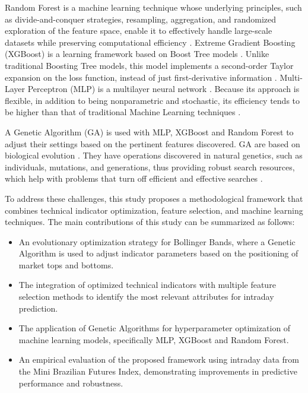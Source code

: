 \documentclass{ieeeaccess}
\begin{document}
Random Forest is a machine learning technique whose underlying principles, such as divide-and-conquer strategies, resampling, aggregation, and randomized exploration of the feature space, enable it to effectively handle large-scale datasets while preserving computational efficiency \cite{biau2016random}. Extreme Gradient Boosting (XGBoost) is a learning framework based on Boost Tree models \cite{chen2016xgboost}. Unlike traditional Boosting Tree models, this model implements a second-order Taylor expansion on the loss function, instead of just first-derivative information \cite{li2019gene}. Multi-Layer Perceptron (MLP) is a multilayer neural network \cite{taud2017multilayer}. Because its approach is flexible, in addition to being nonparametric and stochastic, its efficiency tends to be higher than that of traditional Machine Learning techniques \cite{costa1997evaluating}.

A Genetic Algorithm (GA) is used with MLP, XGBoost and Random Forest to adjust their settings based on the pertinent features discovered. GA are based on biological evolution \cite{forrest1996genetic}. They have operations discovered in natural genetics, such as individuals, mutations, and generations, thus providing robust search resources, which help with problems that turn off efficient and effective searches \cite{sivanandam2008genetic}.

To address these challenges, this study proposes a methodological framework that combines technical indicator optimization, feature selection, and machine learning techniques.
The main contributions of this study can be summarized as follows:

\begin{itemize}

\item An evolutionary optimization strategy for Bollinger Bands, where a Genetic Algorithm is used to adjust indicator parameters based on the positioning of market tops and bottoms.

\item The integration of optimized technical indicators with multiple feature selection methods to identify the most relevant attributes for intraday prediction.

\item The application of Genetic Algorithms for hyperparameter optimization of machine learning models, specifically MLP, XGBoost and Random Forest.

\item An empirical evaluation of the proposed framework using intraday data from the Mini Brazilian Futures Index, demonstrating improvements in predictive performance and robustness.

\end{itemize}
\end{document}
